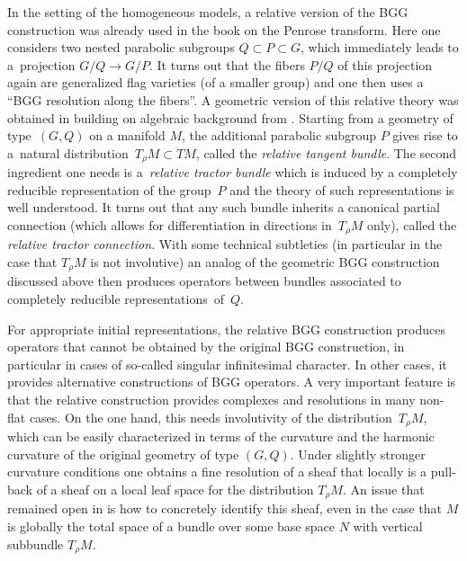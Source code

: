 \documentclass[pdftex]{sigma}
\numberwithin{equation}{section}
\begin{document}
In the setting of the homogeneous models, a relative version of the BGG construction
was already used in the book \cite{BEastwood} on the Penrose transform. Here one
considers two nested parabolic subgroups $Q\subset P\subset G$, which immediately
leads to a~projection $G/Q\to G/P$. It turns out that the fibers $P/Q$ of this
projection again are generalized flag varieties (of a smaller group) and one then
uses a ``BGG resolution along the fibers''. A geometric version of this relative
theory was obtained in \cite{Rel-BGG2} building on algebraic background from
\cite{Rel-BGG1}. Starting from a geometry of type~$(G,Q)$ on a manifold $M$, the
additional parabolic subgroup $P$ gives rise to a~natural distribution~${T_\rho
M\subset TM}$, called the \textit{relative tangent bundle}. The second ingredient one
needs is a~\textit{relative tractor bundle} which is induced by a completely
reducible representation of the group~$P$ and the theory of such representations is
well understood. It turns out that any such bundle inherits a canonical partial
connection \big(which allows for differentiation in directions in~$T_\rho M$ only\big),
called the \textit{relative tractor connection}. With some technical subtleties \big(in
particular in the case that $T_\rho M$ is not involutive\big) an analog of the geometric
BGG construction discussed above then produces operators between bundles associated
to completely reducible representations~of~$Q$.

For appropriate initial representations, the relative BGG construction produces
operators that cannot be obtained by the original BGG construction, in particular in
cases of so-called singular infinitesimal character. In other cases, it provides
alternative constructions of BGG operators. A very important feature is that the
relative construction provides complexes and resolutions in many non-flat cases. On
the one hand, this needs involutivity of the distribution~$T_\rho M$, which can be
easily characterized in terms of the curvature and the harmonic curvature of the
original geometry of type $(G,Q)$. Under slightly stronger curvature conditions one
obtains a fine resolution of a sheaf that locally is a pull-back of a sheaf on a
local leaf space for the distribution $T_\rho M$. An issue that remained open in
\cite{Rel-BGG2} is how to concretely identify this sheaf, even in the case that $M$
is globally the total space of a bundle over some base space $N$ with vertical
subbundle $T_\rho M$.
\end{document}
